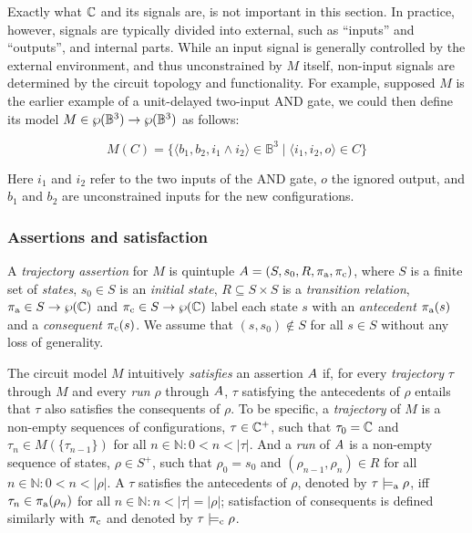 
Exactly what $\mathbb{C}$ and its signals are, is not important in this section. In practice, however, signals are typically divided into external, such as ``inputs'' and ``outputs'', and internal parts. While an input signal is generally controlled by the external environment, and thus unconstrained by $M$ itself, non-input signals are determined by the circuit topology and functionality. For example, supposed $M$ is the earlier example of a unit-delayed two-input AND gate, we could then define its model $M \in \wp(\mathbb{B}^{3}) \rightarrow \wp(\mathbb{B}^{3})$ as follows:


\begin{equation*}
M(C) = \{ \langle b_{1}, b_{2}, i_{1} \wedge i_{2} \rangle \in \mathbb{B}^{3} \mid \langle i_{1}, i_{2}, o \rangle \in C \}
\end{equation*}

\noindent Here $i_{1}$ and $i_{2}$ refer to the two inputs of the AND gate, $o$ the ignored output, and $b_{1}$ and $b_{2}$ are unconstrained inputs for the new configurations.

\subsubsection{Assertions and satisfaction} \label{sec:set-ste-sat}

A \textit{trajectory assertion} for $M$ is quintuple $A = (S, s_{0}, R, \operatorname{\pi_{\textrm{a}}}, \operatorname{\pi_{\textrm{c}}})$, where $S$ is a finite set of \textit{states}, $s_{0} \in S$ is an \textit{initial state}, $R \subseteq S \times S$ is a \textit{transition relation}, $\operatorname{\pi_{\textrm{a}}} \in S \rightarrow \wp(\mathbb{C})$ and $\operatorname{\pi_{\textrm{c}}} \in S \rightarrow \wp(\mathbb{C})$ label each state $s$ with an \textit{antecedent} $\operatorname{\pi_{\textrm{a}}}(s)$ and a \textit{consequent} $\operatorname{\pi_{\textrm{c}}}(s)$. We assume that $(s,s_{0}) \notin S$ for all $s \in S$ without any loss of generality.

The circuit model $M$ intuitively \textit{satisfies} an assertion $A$ if, for every \textit{trajectory} $\tau$ through $M$ and every \textit{run} $\rho$ through $A$, $\tau$ satisfying the antecedents of $\rho$ entails that $\tau$ also satisfies the consequents of $\rho$. To be specific, a \textit{trajectory} of $M$ is a non-empty sequences of configurations, $\tau \in \mathbb{C}^{+}$, such that $\tau_{0} = \mathbb{C}$ and $\tau_{n} \in M(\{ \tau_{n-1} \})$ for all $n \in \mathbb{N} : 0 < n < | \tau |$. And a \textit{run} of $A$ is a non-empty sequence of states, $\rho \in S^{+}$, such that $\rho_{0} = s_{0}$ and $(\rho_{n-1}, \rho_{n}) \in R$ for all $n \in \mathbb{N} : 0 < n < | \rho |$. A $\tau$ satisfies the antecedents of $\rho$, denoted by $\tau \models_{\textrm{a}} \rho$, iff $\tau_{n} \in \operatorname{\pi_{\textrm{a}}}(\rho_{n})$ for all $n \in \mathbb{N} : n < | \tau | = | \rho |$; satisfaction of consequents is defined similarly with $\operatorname{\pi_{\textrm{c}}}$ and denoted by $\tau \models_{\textrm{c}} \rho$.

